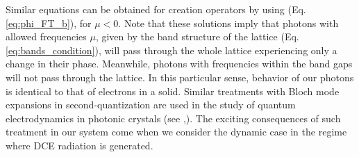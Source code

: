 Similar equations can be obtained for creation operators by using (Eq. \ref{eq:phi_FT_b}), for $\mu<0$. Note that these solutions imply that photons with allowed frequencies $\mu$, given by the band structure of the lattice (Eq. \ref{eq:bands_condition}), will pass through the whole lattice experiencing only a change in their phase. Meanwhile, photons with frequencies within the band gaps will not pass through the lattice. In this particular sense, behavior of our photons is identical to that of electrons in a solid. Similar treatments with Bloch mode expansions in second-quantization are used in the study of quantum electrodynamics in photonic crystals (see \cite{Gainutdinov2018},\cite{Gainutdinov2021}). The exciting consequences of such treatment in our system come when we consider the dynamic case in the regime where DCE radiation is generated.





